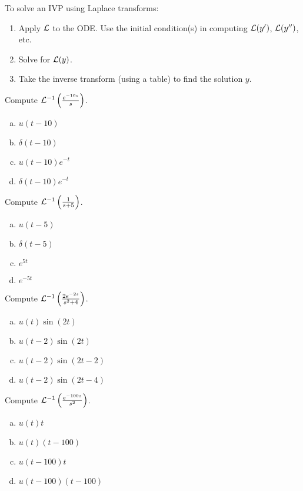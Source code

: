 \begin{applicationActivities}

\begin{observation}
To solve an IVP using Laplace transforms:
\begin{enumerate}[1)]
\item Apply \(\mathcal{L}\) to the ODE.  Use the initial condition(s) in computing \(\mathcal{L}(y')\), \(\mathcal{L}(y'')\), etc.
\item Solve for \(\mathcal{L}(y)\).
\item Take the inverse transform (using a table) to find the solution \(y\).
\end{enumerate}
\end{observation}

\begin{activity}{5}
Compute \(\mathcal{L}^{-1} \left( \frac{e^{-10s}}{s}\right) \).
\begin{enumerate}[(a)]
\item \(u(t-10)\)
\item \(\delta(t-10)\)
\item \(u(t-10)e^{-t}\)
\item \(\delta(t-10)e^{-t}\)
\end{enumerate}
\end{activity}


\begin{activity}{5}
Compute \(\mathcal{L}^{-1} \left( \frac{1}{s+5}\right) \).
\begin{enumerate}[(a)]
\item \(u(t-5)\)
\item \(\delta(t-5)\)
\item \(e^{5t}\)
\item \(e^{-5t}\)
\end{enumerate}
\end{activity}

\begin{activity}{5}
Compute \(\mathcal{L}^{-1}\left(\frac{2e^{-2s}}{s^2+4}\right) \).
\begin{enumerate}[(a)]
\item \(u(t)\sin(2t)\)
\item \(u(t-2)\sin(2t)\)
\item \(u(t-2)\sin(2t-2)\)
\item \(u(t-2)\sin(2t-4)\)
\end{enumerate}
\end{activity}

\begin{activity}{5}
Compute \(\mathcal{L}^{-1} \left( \frac{e^{-100s}}{s^2}\right) \).
\begin{enumerate}[(a)]
\item \(u(t)t\)
\item \(u(t)(t-100)\)
\item \(u(t-100)t\)
\item \(u(t-100)(t-100)\)
\end{enumerate}
\end{activity}




\end{applicationActivities}

